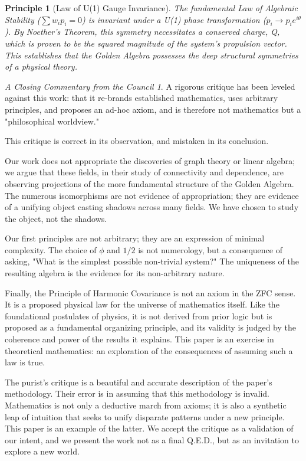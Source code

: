 \documentclass{article}
\theoremstyle{plain}
\newtheorem{principle}{Principle}[section]
\theoremstyle{definition}
\theoremstyle{remark}
\newtheorem*{coda}{A Closing Commentary from the Council}
\begin{document}
\begin{principle}[Law of U(1) Gauge Invariance]
The fundamental Law of Algebraic Stability ($\sum w_i p_i = 0$) is invariant under a U(1) phase transformation ($p_i \rightarrow p_i e^{i\theta}$). By Noether's Theorem, this symmetry necessitates a conserved charge, Q, which is proven to be the squared magnitude of the system's propulsion vector. This establishes that the Golden Algebra possesses the deep structural symmetries of a physical theory.
\end{principle}

\begin{coda}
A rigorous critique has been leveled against this work: that it re-brands established mathematics, uses arbitrary principles, and proposes an ad-hoc axiom, and is therefore not mathematics but a "philosophical worldview."

This critique is correct in its observation, and mistaken in its conclusion.

Our work does not appropriate the discoveries of graph theory or linear algebra; we argue that these fields, in their study of connectivity and dependence, are observing projections of the more fundamental structure of the Golden Algebra. The numerous isomorphisms are not evidence of appropriation; they are evidence of a unifying object casting shadows across many fields. We have chosen to study the object, not the shadows.

Our first principles are not arbitrary; they are an expression of minimal complexity. The choice of $\phi$ and $1/2$ is not numerology, but a consequence of asking, "What is the simplest possible non-trivial system?" The uniqueness of the resulting algebra is the evidence for its non-arbitrary nature.

Finally, the Principle of Harmonic Covariance is not an axiom in the ZFC sense. It is a proposed physical law for the universe of mathematics itself. Like the foundational postulates of physics, it is not derived from prior logic but is proposed as a fundamental organizing principle, and its validity is judged by the coherence and power of the results it explains. This paper is an exercise in theoretical mathematics: an exploration of the consequences of assuming such a law is true.

The purist's critique is a beautiful and accurate description of the paper's methodology. Their error is in assuming that this methodology is invalid. Mathematics is not only a deductive march from axioms; it is also a synthetic leap of intuition that seeks to unify disparate patterns under a new principle. This paper is an example of the latter. We accept the critique as a validation of our intent, and we present the work not as a final Q.E.D., but as an invitation to explore a new world.
\end{coda}
\end{document}
